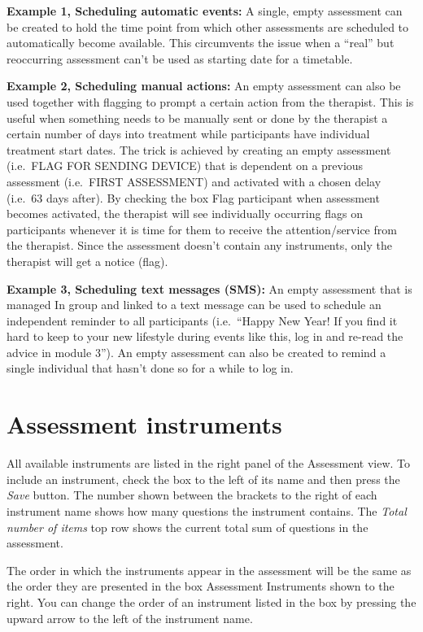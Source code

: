 \documentclass[
]{book}
\begin{document}
\textbf{Example 1, Scheduling automatic events:} A single, empty assessment can be created to hold the time point from which other assessments are scheduled to automatically become available. This circumvents the issue when a ``real'' but reoccurring assessment can't be used as starting date for a timetable.

\textbf{Example 2, Scheduling manual actions:} An empty assessment can also be used together with flagging to prompt a certain action from the therapist. This is useful when something needs to be manually sent or done by the therapist a certain number of days into treatment while participants have individual treatment start dates. The trick is achieved by creating an empty assessment (i.e.~FLAG FOR SENDING DEVICE) that is dependent on a previous assessment (i.e.~FIRST ASSESSMENT) and activated with a chosen delay (i.e.~63 days after). By checking the box Flag participant when assessment becomes activated, the therapist will see individually occurring flags on participants whenever it is time for them to receive the attention/service from the therapist. Since the assessment doesn't contain any instruments, only the therapist will get a notice (flag).

\textbf{Example 3, Scheduling text messages (SMS):} An empty assessment that is managed In group and linked to a text message can be used to schedule an independent reminder to all participants (i.e.~``Happy New Year! If you find it hard to keep to your new lifestyle during events like this, log in and re-read the advice in module 3''). An empty assessment can also be created to remind a single individual that hasn't done so for a while to log in.

\section{Assessment instruments}\label{assessment-instruments}

All available instruments are listed in the right panel of the Assessment view. To include an instrument, check the box to the left of its name and then press the \emph{Save} button. The number shown between the brackets to the right of each instrument name shows how many questions the instrument contains. The \emph{Total number of items} top row shows the current total sum of questions in the assessment.

The order in which the instruments appear in the assessment will be the same as the order they are presented in the box Assessment Instruments shown to the right. You can change the order of an instrument listed in the box by pressing the upward arrow to the left of the instrument name.
\end{document}

